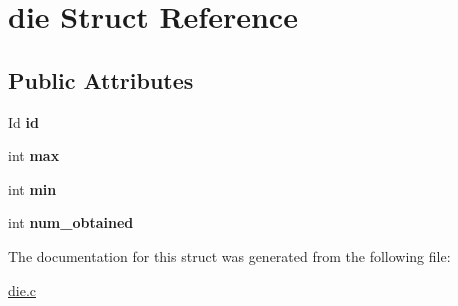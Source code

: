 \hypertarget{structdie}{}\section{die Struct Reference}
\label{structdie}
\subsection*{Public Attributes}
\begin{DoxyCompactItemize}
\item 
\mbox{\label{structdie_a2c350128dce1f302cee19bcc5fc17f14}} 
Id {\bfseries id}
\item 
\mbox{\label{structdie_ace347f4b96d09f6dcede22c9969958a1}} 
int {\bfseries max}
\item 
\mbox{\label{structdie_a9c9d30fd7d3ec42043c1a6be8a2d61d5}} 
int {\bfseries min}
\item 
\mbox{\label{structdie_a3f4afd9479e14c36c10f50e5e4c9006c}} 
int {\bfseries num\+\_\+obtained}
\end{DoxyCompactItemize}


The documentation for this struct was generated from the following file\+:\begin{DoxyCompactItemize}
\item 
\hyperlink{die_8c}{die.\+c}\end{DoxyCompactItemize}
